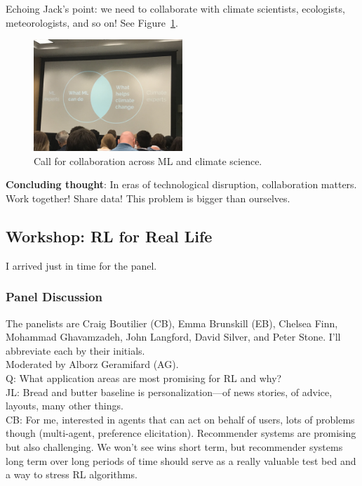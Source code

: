 Echoing Jack's point: we need to collaborate with climate scientists, ecologists, meteorologists, and so on! See Figure~\ref{fig:venn}.

\begin{figure}
    \centering
    \includegraphics[width=0.5\textwidth]{images/venn.JPG}
    \caption{Call for collaboration across ML and climate science.}
    \label{fig:venn}
\end{figure}


{\bf Concluding thought}: In eras of technological disruption, collaboration matters. Work together! Share data! This problem is bigger than ourselves.

\spacerule

\subsection{Workshop: RL for Real Life}

I arrived just in time for the panel.

\subsubsection{Panel Discussion}
\label{sec:panel}

The panelists are Craig Boutilier (CB), Emma Brunskill (EB), Chelsea Finn, Mohammad Ghavamzadeh, John Langford, David Silver, and Peter Stone. I'll abbreviate each by their initials. \\

Moderated by Alborz Geramifard (AG). \\

Q: What application areas are most promising for RL and why? \\

JL: Bread and butter baseline is personalization---of news stories, of advice, layouts, many other things. \\

CB: For me, interested in agents that can act on behalf of users, lots of problems though (multi-agent, preference elicitation). Recommender systems are promising but also challenging. We won't see wins short term, but recommender systems long term over long periods of time should serve as a really valuable test bed and a way to stress RL algorithms. \\

